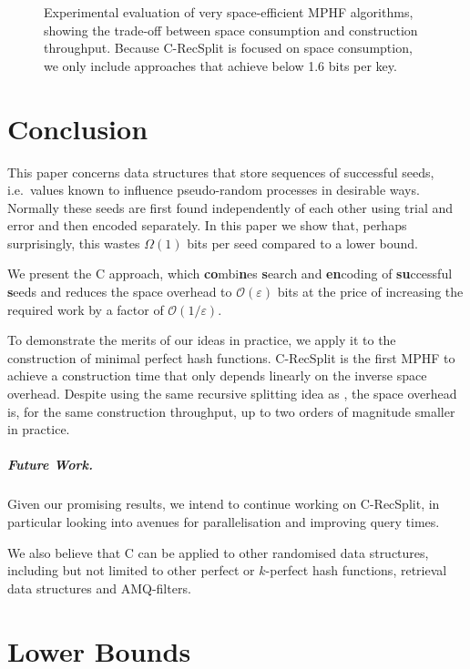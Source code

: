 \documentclass[cleveref,thm-restate]{lipics-v2021}
\def\consensus{\texorpdfstring{C\scalebox{0.8}{ONSENSUS}}{CONSENSUS}\xspace}
\begin{document}
\begin{figure}[t]
  \centering
  
  \caption{
      Experimental evaluation of very space-efficient MPHF algorithms, showing the trade-off between space consumption and construction throughput.
      Because \consensus-RecSplit is focused on space consumption, we only include approaches that achieve below 1.6 bits per key.
  }
  \label{fig:paretoMphf}
\end{figure}

\section{Conclusion}\label{sec:conclusion}

This paper concerns data structures that store sequences of successful seeds, i.e.\ values known to influence pseudo-random processes in desirable ways. Normally these seeds are first found independently of each other using trial and error and then encoded separately. In this paper we show that, perhaps surprisingly, this wastes $Ω(1)$ bits per seed compared to a lower bound.

We present the \consensus approach, which \textbf{co}mbi\textbf{n}es \textbf{s}earch and \textbf{en}coding of \textbf{su}ccessful \textbf{s}eeds and reduces the space overhead to $𝒪(ε)$ bits at the price of increasing the required work by a factor of $𝒪(1/ε)$.


To demonstrate the merits of our ideas in practice, we apply it to the construction of minimal perfect hash functions.
\consensus-RecSplit is the first MPHF to achieve a construction time that only depends linearly on the inverse space overhead.
Despite using the same recursive splitting idea as \cite{esposito2020recsplit}, the space overhead is, for the same construction throughput, up to two orders of magnitude smaller in practice.


\subparagraph{Future Work.}
Given our promising results, we intend to continue working on \consensus-RecSplit, in particular looking into avenues for parallelisation and improving query times.

We also believe that \consensus can be applied to other randomised data structures, including but not limited to other perfect or $k$-perfect hash functions, retrieval data structures and AMQ-filters.


\clearpage
\appendix

\section{Lower Bounds}
\label{sec:lower-bounds-analysis}
\end{document}
